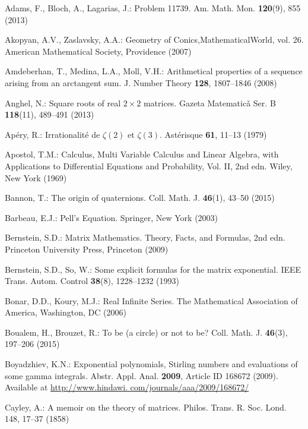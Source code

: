 

\begin{thebibliography}{99}
  Adams, F., Bloch, A., Lagarias, J.: Problem 11739. Am. Math. Mon. \textbf{120}(9), 855 (2013)

  Akopyan, A.V., Zaslavsky, A.A.: Geometry of Conics,MathematicalWorld, vol. 26. American
  Mathematical Society, Providence (2007)

  Amdeberhan, T., Medina, L.A., Moll, V.H.: Arithmetical properties of a sequence arising from
  an arctangent sum. J. Number Theory \textbf{128}, 1807–1846 (2008)

  Anghel, N.: Square roots of real $2\times2$ matrices. Gazeta Matematic\v a Ser. B \textbf{118}(11), 489–491
(2013)

  Ap\'ery, R.: Irrationalit\'e de $\zeta(2)$ et $\zeta(3)$. Ast\'erisque \textbf{61}, 11–13 (1979)

  Apostol, T.M.: Calculus, Multi Variable Calculus and Linear Algebra, with Applications to
  Differential Equations and Probability, Vol. II, 2nd edn. Wiley, New York (1969)

  Bannon, T.: The origin of quaternions. Coll. Math. J. \textbf{46}(1), 43–50 (2015)

  Barbeau, E.J.: Pell’s Equation. Springer, New York (2003)

  Bernstein, S.D.: Matrix Mathematics. Theory, Facts, and Formulas, 2nd edn. Princeton
  University Press, Princeton (2009)

  Bernstein, S.D., So, W.: Some explicit formulas for the matrix exponential. IEEE Trans.
  Autom. Control \textbf{38}(8), 1228–1232 (1993)

  Bonar, D.D., Koury, M.J.: Real Infinite Series. The Mathematical Association of America,
  Washington, DC (2006)

  Boualem, H., Brouzet, R.: To be (a circle) or not to be? Coll. Math. J. \textbf{46}(3), 197–206 (2015)

  Boyadzhiev, K.N.: Exponential polynomials, Stirling numbers and evaluations of some gamma
  integrals. Abstr. Appl. Anal. \textbf{2009}, Article ID 168672 (2009). Available at \href{http://www.hindawi.
  com/journals/aaa/2009/168672/}{http://www.hindawi.
  com/journals/aaa/2009/168672/}

  Cayley, A.: A memoir on the theory of matrices. Philos. Trans. R. Soc. Lond. 148, 17–37
  (1858)


\end{thebibliography}
